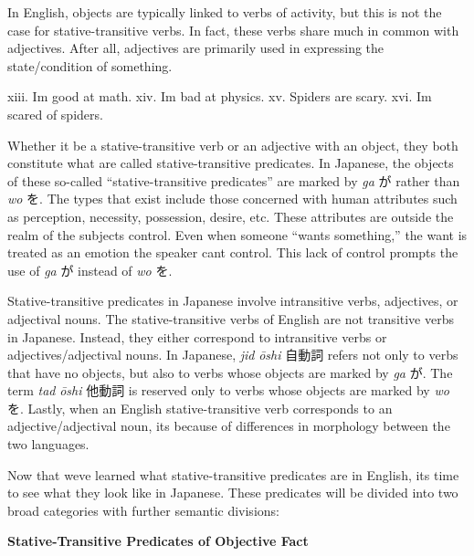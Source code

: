 \par{ In English, objects are typically linked to verbs of activity, but this is not the case for stative-transitive verbs. In fact, these verbs share much in common with adjectives. After all, adjectives are primarily used in expressing the state\slash condition of something. }

\par{xiii. I\textquotesingle m good at math. \hfill\break
xiv. I\textquotesingle m bad at physics. \hfill\break
xv. Spiders are scary. \hfill\break
xvi. I\textquotesingle m scared of spiders. }

\par{ Whether it be a stative-transitive verb or an adjective with an object, they both constitute what are called stative-transitive predicates. In Japanese, the objects of these so-called “stative-transitive predicates” are marked by \emph{ga }が rather than \emph{wo }を. The types that exist include those concerned with human attributes such as perception, necessity, possession, desire, etc. These attributes are outside the realm of the subject\textquotesingle s control. Even when someone “wants something,” the want is treated as an emotion the speaker can\textquotesingle t control. This lack of control prompts the use of \emph{ga }が instead of \emph{wo }を. }

\par{ Stative-transitive predicates in Japanese involve intransitive verbs, adjectives, or adjectival nouns. The stative-transitive verbs of English are not transitive verbs in Japanese. Instead, they either correspond to intransitive verbs or adjectives\slash adjectival nouns. In Japanese, \emph{jid }\emph{ōshi }自動詞 refers not only to verbs that have no objects, but also to verbs whose objects are marked by \emph{ga }が. The term \emph{tad }\emph{ōshi }他動詞 is reserved only to verbs whose objects are marked by \emph{wo }を. Lastly, when an English stative-transitive verb corresponds to an adjective\slash adjectival noun, it\textquotesingle s because of differences in morphology between the two languages. }

\par{ Now that we\textquotesingle ve learned what stative-transitive predicates are in English, it\textquotesingle s time to see what they look like in Japanese. These predicates will be divided into two broad categories with further semantic divisions: }

\begin{center}
\textbf{Stative-Transitive Predicates of Objective Fact }
\end{center}

